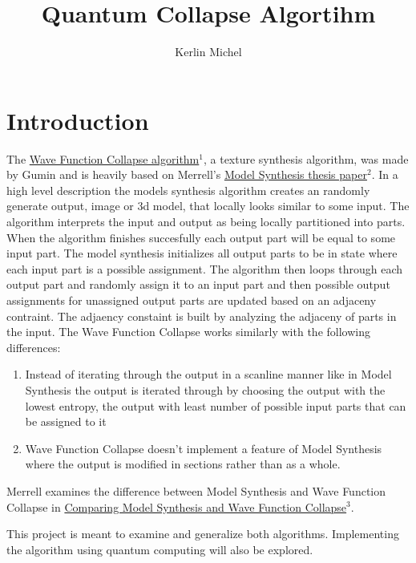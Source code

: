 \documentclass{article}
\begin{document}
\title{Quantum Collapse Algortihm}
\author{Kerlin Michel}
\date{}
\maketitle

\section{Introduction}
The \href{https://github.com/mxgmn/WaveFunctionCollapse}{Wave Function Collapse algorithm}$^1$, a texture synthesis algorithm, was made by Gumin
and is heavily based on Merrell's \href{https://paulmerrell.org//thesis.pdf}{Model Synthesis thesis paper}$^2$. In a high level description the models
synthesis algorithm creates an randomly generate output, image or 3d model, that locally looks similar to some input. The algorithm interprets the 
input and output as being locally partitioned into parts. When the algorithm finishes succesfully each output part will be equal to some input part.
The model synthesis initializes all output parts to be in state where each input part is a possible assignment. The algorithm then loops through each output part
and randomly assign it to an input part and then possible output assignments for unassigned output parts are updated based on an adjaceny contraint. The adjaency
constaint is built by analyzing the adjaceny of parts in the input. The Wave Function Collapse works similarly with the following differences:
\begin{enumerate}
    \item Instead of iterating through the output in a scanline manner like in Model Synthesis the output is iterated through by choosing the output with the
          lowest entropy, the output with least number of possible input parts that can be assigned to it
    \item  Wave Function Collapse doesn't implement a feature of Model Synthesis where the output is modified in sections rather than as a whole.
\end{enumerate}
Merrell examines the difference between Model Synthesis and Wave Function Collapse in
\href{https://paulmerrell.org/wp-content/uploads/2021/07/comparison.pdf}{Comparing Model Synthesis and Wave Function Collapse}$^3$.


This project is meant to examine and generalize both algorithms. Implementing the algorithm using quantum computing will also be explored.

\listofalgorithms
\end{document}
